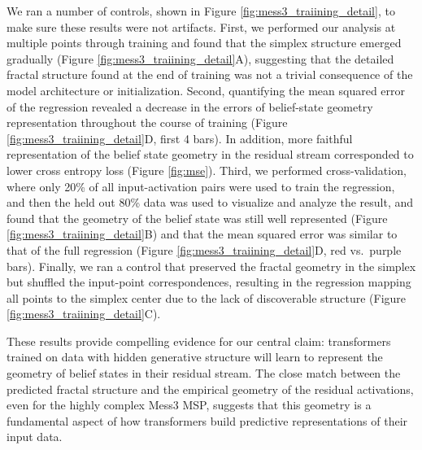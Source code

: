 \documentclass{article}
\begin{document}
We ran a number of controls, shown in Figure \ref{fig:mess3_traiining_detail}, to make sure these results were not artifacts. First, we performed our analysis at multiple points through training and found that the simplex structure emerged gradually (Figure \ref{fig:mess3_traiining_detail}A), suggesting that the detailed fractal structure found at the end of training was not a trivial consequence of the model architecture or initialization. Second, quantifying the mean squared error of the regression revealed a decrease in the errors of belief-state geometry representation throughout the course of training (Figure \ref{fig:mess3_traiining_detail}D, first 4 bars). In addition, more faithful representation of the belief state geometry in the residual stream corresponded to lower cross entropy loss (Figure \ref{fig:mse}). Third, we performed cross-validation, where only 20\% of all input-activation pairs were used to train the regression, and then the held out 80\% data was used to visualize and analyze the result, and found that the geometry of the belief state was still well represented (Figure \ref{fig:mess3_traiining_detail}B) and that the mean squared error was similar to that of the full regression (Figure \ref{fig:mess3_traiining_detail}D, red vs.\ purple bars). 
Finally, we ran a control that preserved the fractal geometry in the simplex but shuffled the input-point correspondences, resulting in the regression mapping all points to the simplex center due to the lack of discoverable structure (Figure \ref{fig:mess3_traiining_detail}C).

These results provide compelling evidence for our central claim: transformers trained on data with hidden generative structure will learn to represent the geometry of belief states in their residual stream. The close match between the predicted fractal structure and the empirical geometry of the residual activations, even for the highly complex Mess3 MSP, suggests that this geometry is a fundamental aspect of how transformers build predictive representations of their input data.
\end{document}
